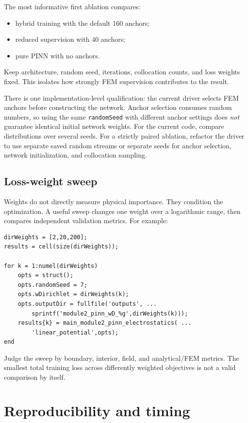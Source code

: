 \documentclass[11pt]{article}
\begin{document}
The most informative first ablation compares:
\begin{itemize}[leftmargin=*]
  \item hybrid training with the default 160 anchors;
  \item reduced supervision with 40 anchors;
  \item pure PINN with no anchors.
\end{itemize}
Keep architecture, random seed, iterations, collocation counts, and loss weights fixed. This isolates how strongly FEM supervision contributes to the result.

There is one implementation-level qualification: the current driver selects FEM anchors before constructing the network. Anchor selection consumes random numbers, so using the same \texttt{randomSeed} with different anchor settings does \emph{not} guarantee identical initial network weights. For the current code, compare distributions over several seeds. For a strictly paired ablation, refactor the driver to use separate saved random streams or separate seeds for anchor selection, network initialization, and collocation sampling.

\subsection{Loss-weight sweep}

Weights do not directly measure physical importance. They condition the optimization. A useful sweep changes one weight over a logarithmic range, then compares independent validation metrics. For example:
\begin{lstlisting}[style=projectmatlab]
dirWeights = [2,20,200];
results = cell(size(dirWeights));

for k = 1:numel(dirWeights)
    opts = struct();
    opts.randomSeed = 7;
    opts.wDirichlet = dirWeights(k);
    opts.outputDir = fullfile('outputs', ...
        sprintf('module2_pinn_wD_%g',dirWeights(k)));
    results{k} = main_module2_pinn_electrostatics( ...
        'linear_potential',opts);
end
\end{lstlisting}
Judge the sweep by boundary, interior, field, and analytical/FEM metrics. The smallest total training loss across differently weighted objectives is not a valid comparison by itself.

\section{Reproducibility and timing}
\end{document}
